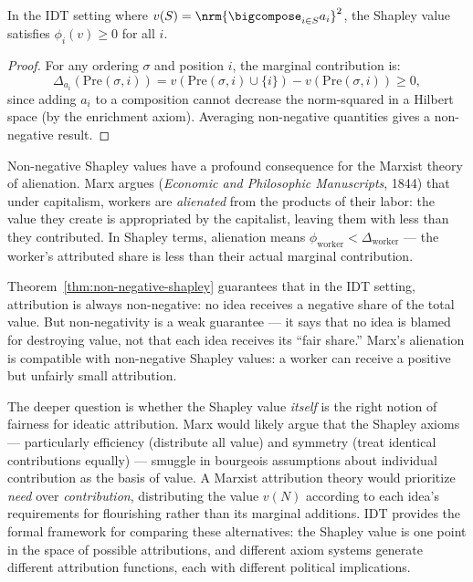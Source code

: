 \begin{theorem}
\label{thm:non-negative-shapley}
In the IDT setting where $v(S) = \nrm{\bigcompose_{i \in S} a_i}^2$, the
Shapley value satisfies $\phi_i(v) \geq 0$ for all $i$.
\end{theorem}

\begin{proof}
For any ordering $\sigma$ and position $i$, the marginal contribution is:
\[
  \Delta_{a_i}(\text{Pre}(\sigma, i)) = v(\text{Pre}(\sigma, i) \cup \{i\})
  - v(\text{Pre}(\sigma, i)) \geq 0,
\]
since adding $a_i$ to a composition cannot decrease the norm-squared in a
Hilbert space (by the enrichment axiom).  Averaging non-negative quantities
gives a non-negative result.
\end{proof}

\begin{interpretation}
\label{interp:ch21:marx_alienation}
Non-negative Shapley values have a profound consequence for the Marxist
theory of alienation.  Marx argues (\textit{Economic and Philosophic
Manuscripts}, 1844) that under capitalism, workers are \emph{alienated}
from the products of their labor: the value they create is appropriated
by the capitalist, leaving them with less than they contributed.  In
Shapley terms, alienation means $\phi_{\text{worker}} < \Delta_{\text{worker}}$
--- the worker's attributed share is less than their actual marginal
contribution.

Theorem~\ref{thm:non-negative-shapley} guarantees that in the IDT
setting, attribution is always non-negative: no idea receives a
negative share of the total value.  But non-negativity is a weak
guarantee --- it says that no idea is blamed for destroying value, not
that each idea receives its ``fair share.''  Marx's alienation is
compatible with non-negative Shapley values: a worker can receive a
positive but unfairly small attribution.

The deeper question is whether the Shapley value \emph{itself} is the
right notion of fairness for ideatic attribution.  Marx would likely
argue that the Shapley axioms --- particularly efficiency (distribute all
value) and symmetry (treat identical contributions equally) --- smuggle
in bourgeois assumptions about individual contribution as the basis of
value.  A Marxist attribution theory would prioritize \emph{need} over
\emph{contribution}, distributing the value $v(N)$ according to each
idea's requirements for flourishing rather than its marginal additions.
IDT provides the formal framework for comparing these alternatives:
the Shapley value is one point in the space of possible attributions,
and different axiom systems generate different attribution functions,
each with different political implications.
\end{interpretation}

